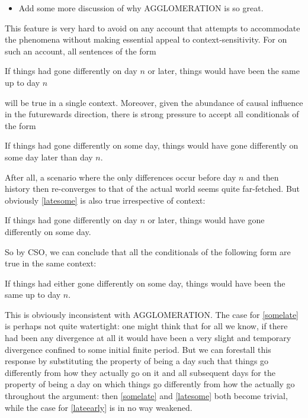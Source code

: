 \documentclass[If.tex]{subfiles}
\begin{document}
\begin{prop}
\begin{itemize} 
	\item
	Add some more discussion of why AGGLOMERATION is so great. 
\end{itemize}

This feature is very hard to avoid on any account that attempts to accommodate the phenomena without making essential appeal to context-sensitivity. For on such an account, all sentences of the form
\begin{prop}
	\nitem \label{lateearly}
		If things had gone differently on day $n$ or later, things would have been the same up to day $n$
\end{prop}
will be true in a single context. Moreover, given the abundance of causal influence in the futurewards direction, there is strong pressure to accept all conditionals of the form
\begin{prop}
	\nitem \label{somelate}
		If things had gone differently on some day, things would have gone differently on some day later than day $n$.
\end{prop}
After all, a scenario where the only differences occur before day $n$ and then history then re-converges to that of the actual world seems quite far-fetched. But obviously \ref{latesome} is also true irrespective of context:
\begin{prop}
	\nitem \label{latesome}
		If things had gone differently on day $n$ or later, things would have gone differently on some day.
\end{prop}
So by CSO, we can conclude that all the conditionals of the following form are true in the same context:
\begin{prop}
	\nitem \label{someearly}
		If things had either gone differently on some day, things would have been the same up to day $n$.
\end{prop}
This is obviously inconsistent with AGGLOMERATION. The case for \ref{somelate} is perhaps not quite watertight: one might think that for all we know, if there had been any divergence at all it would have been a very slight and temporary divergence confined to some initial finite period. But we can forestall this response by substituting the property of being a day such that things go differently from how they actually go on it and all subsequent days for the property of being a day on which things go differently from how the actually go throughout the argument: then \ref{somelate} and \ref{latesome} both become trivial, while the case for \ref{lateearly} is in no way weakened.


\end{prop}
\end{document}
